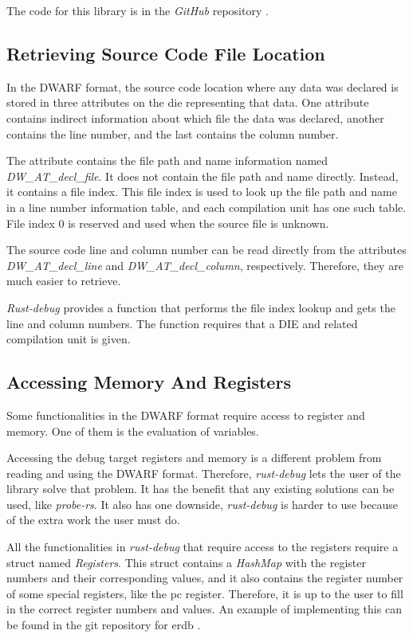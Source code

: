 The code for this library is in the \emph{GitHub} repository \cite{rust-debug}.



\subsection{Retrieving Source Code File Location} \label{sec:decl}
In the \gls{DWARF} format, the source code location where any data was declared is stored in three attributes on the \gls{die} representing that data.
One attribute contains indirect information about which file the data was declared, another contains the line number, and the last contains the column number.


The attribute contains the file path and name information named \emph{DW\_AT\_decl\_file}.
It does not contain the file path and name directly.
Instead, it contains a file index.
This file index is used to look up the file path and name in a line number information table, and each compilation unit has one such table.
File index 0 is reserved and used when the source file is unknown.


The source code line and column number can be read directly from the attributes \emph{DW\_AT\_decl\_line} and \emph{DW\_AT\_decl\_column}, respectively.
Therefore, they are much easier to retrieve.


\emph{Rust-debug} provides a function that performs the file index lookup and gets the line and column numbers.
The function requires that a DIE and related compilation unit is given.


\subsection{Accessing Memory And Registers}
Some functionalities in the \gls{DWARF} format require access to register and memory.
One of them is the evaluation of variables.


Accessing the debug target registers and memory is a different problem from reading and using the \gls{DWARF} format.
Therefore, \emph{rust-debug} lets the user of the library solve that problem.
It has the benefit that any existing solutions can be used, like \emph{probe-rs}.
It also has one downside, \emph{rust-debug} is harder to use because of the extra work the user must do.


All the functionalities in \emph{rust-debug} that require access to the registers require a struct named \emph{Registers}.
This struct contains a \emph{HashMap} with the register numbers and their corresponding values, and it also contains the register number of some special registers, like the \gls{pc} register.
Therefore, it is up to the user to fill in the correct register numbers and values.
An example of implementing this can be found in the git repository for \gls{erdb} \cite{erdb}.


